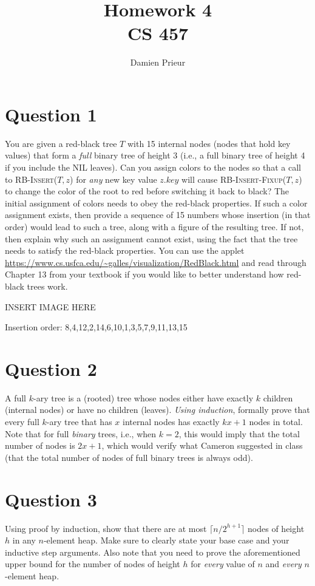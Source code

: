 \documentclass{article}
\author{Damien Prieur}
\title{Homework 4 \\ CS 457}
\date{}
\begin{document}
\maketitle

\section*{Question 1}
You are given a red-black tree $T$ with 15 internal nodes (nodes that hold key values)
that form a \emph{full} binary tree of height 3 (i.e., a full binary tree of height 4 if you include
the NIL leaves). Can you assign colors to the nodes so that a call to \textsc{RB-Insert}($T,z$) for
\emph{any} new key value $z.key$ will cause \textsc{RB-Insert-Fixup}($T,z$) to change the color of the
root to red before switching it back to black? The initial assignment of colors needs to obey the
red-black properties. If such a color assignment exists, then provide a sequence of 15 numbers whose
insertion (in that order) would lead to such a tree, along with a figure of the resulting tree. If not,
then explain why such an assignment cannot exist, using the fact that the tree needs to satisfy the
red-black properties. You can use the applet \url{https://www.cs.usfca.edu/~galles/visualization/RedBlack.html}
and read through Chapter 13 from your textbook if you would like to better understand how red-black trees work.

INSERT IMAGE HERE

Insertion order:
8,4,12,2,14,6,10,1,3,5,7,9,11,13,15

\section*{Question 2}
A full $k$-ary tree is a (rooted) tree whose nodes either have exactly $k$ children
(internal nodes) or have no children (leaves). \emph{Using induction}, formally prove that every full
$k$-ary tree that has $x$ internal nodes has exactly $kx+1$ nodes in total. Note that for full
\emph{binary} trees, i.e., when $k=2$, this would imply that the total number of nodes is $2x+1$,
which would verify what Cameron suggested in class (that the total number of nodes of full binary
trees is always odd).



\section*{Question 3}
Using proof by induction, show that there are at most $\lceil n/2^{h+1}\rceil$
nodes of height $h$ in any $n$-element heap. Make sure to clearly state your base case and your
inductive step arguments. Also note that you need to prove the aforementioned upper bound for the
number of nodes of height $h$ for \emph{every} value of $n$ and \emph{every} $n$-element heap.
\end{document}
